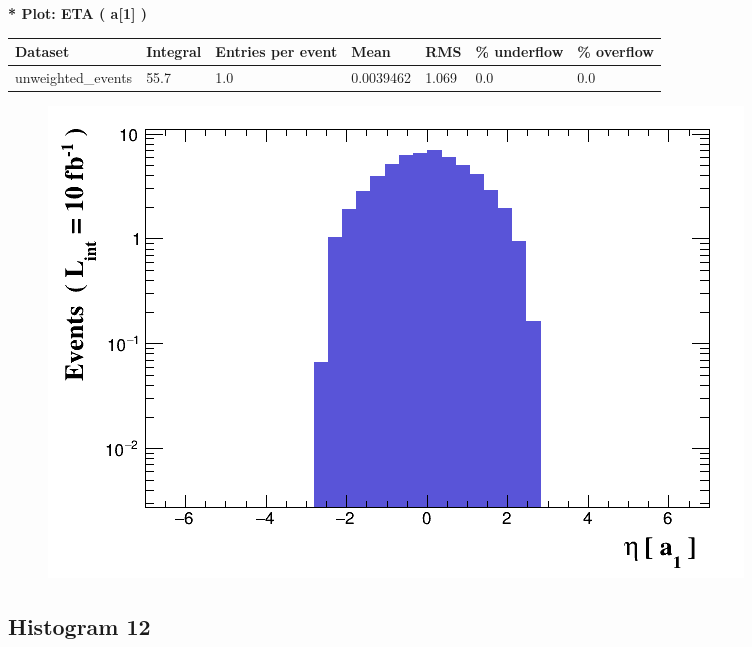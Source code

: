 \documentclass[a4paper, 10pt]{article}
\begin{document}
\textbf{* Plot: ETA ( a[1] ) }\\
   \begin{table}[H]
  \begin{center}
    \begin{tabular}{|m{23.0mm}|m{23.0mm}|m{18.0mm}|m{19.0mm}|m{19.0mm}|m{19.0mm}|m{19.0mm}|}
      \hline
      {\cellcolor{yellow}         Dataset}& {\cellcolor{yellow}         Integral}& {\cellcolor{yellow}         Entries per event}& {\cellcolor{yellow}         Mean}& {\cellcolor{yellow}         RMS}& {\cellcolor{yellow}         \% underflow}& {\cellcolor{yellow}         \% overflow}\\
      \hline
      {\cellcolor{white}         unweighted\_events}& {\cellcolor{white}         55.7}& {\cellcolor{white}         1.0}& {\cellcolor{white}         0.0039462}& {\cellcolor{white}         1.069}& {\cellcolor{green}         0.0}& {\cellcolor{green}         0.0}\\
\hline
    \end{tabular}
  \end{center}
\end{table}

\begin{figure}[H]
  \begin{center}
    \includegraphics[scale=0.45]{selection_10.png}\\
\caption{   }
  \end{center}
\end{figure}
      \newpage
\subsection{ Histogram 12}
\end{document}
